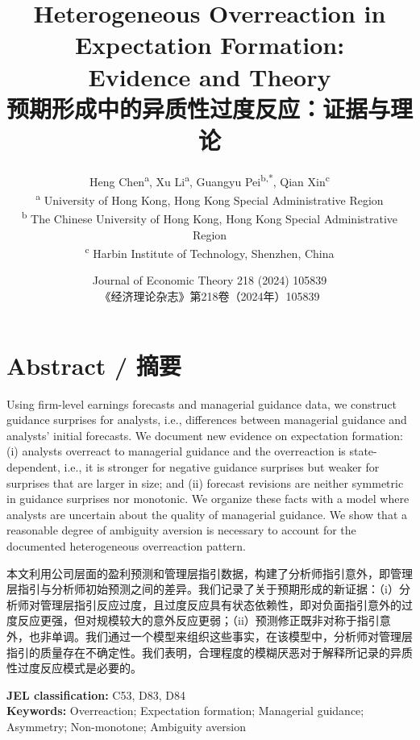\documentclass[12pt,a4paper]{article}
\title{
  {\LARGE\textbf{Heterogeneous Overreaction in Expectation Formation:\\[4pt] Evidence and Theory}}\\[10pt]
  {\large\textbf{\color{transblue}预期形成中的异质性过度反应：证据与理论}}
}
\author{
  Heng Chen\textsuperscript{a}, Xu Li\textsuperscript{a}, Guangyu Pei\textsuperscript{b,*}, Qian Xin\textsuperscript{c}\\[6pt]
  \small
  \textsuperscript{a} University of Hong Kong, Hong Kong Special Administrative Region\\
  \textsuperscript{b} The Chinese University of Hong Kong, Hong Kong Special Administrative Region\\
  \textsuperscript{c} Harbin Institute of Technology, Shenzhen, China
}
\date{Journal of Economic Theory 218 (2024) 105839\\
\color{transblue}《经济理论杂志》第218卷（2024年）105839}
\newenvironment{original}
  {\par\medskip\noindent\ignorespaces}
  {\par\medskip}
\newenvironment{translation}
  {\par\noindent{\color{transblue}\ignorespaces}}
  {\par\bigskip}
\begin{document}
\maketitle

\section*{Abstract / 摘要}
\begin{original}
Using firm-level earnings forecasts and managerial guidance data, we construct guidance surprises for analysts, i.e., differences between managerial guidance and analysts' initial forecasts. We document new evidence on expectation formation: (i) analysts overreact to managerial guidance and the overreaction is state-dependent, i.e., it is stronger for negative guidance surprises but weaker for surprises that are larger in size; and (ii) forecast revisions are neither symmetric in guidance surprises nor monotonic. We organize these facts with a model where analysts are uncertain about the quality of managerial guidance. We show that a reasonable degree of ambiguity aversion is necessary to account for the documented heterogeneous overreaction pattern.
\end{original}
\begin{translation}
本文利用公司层面的盈利预测和管理层指引数据，构建了分析师指引意外，即管理层指引与分析师初始预测之间的差异。我们记录了关于预期形成的新证据：（i）分析师对管理层指引反应过度，且过度反应具有状态依赖性，即对负面指引意外的过度反应更强，但对规模较大的意外反应更弱；（ii）预测修正既非对称于指引意外，也非单调。我们通过一个模型来组织这些事实，在该模型中，分析师对管理层指引的质量存在不确定性。我们表明，合理程度的模糊厌恶对于解释所记录的异质性过度反应模式是必要的。
\end{translation}

\bigskip
\noindent\textbf{JEL classification:} C53, D83, D84\\
\textbf{Keywords:} Overreaction; Expectation formation; Managerial guidance; Asymmetry; Non-monotone; Ambiguity aversion\\

\newpage
\tableofcontents
\newpage

\end{document}
